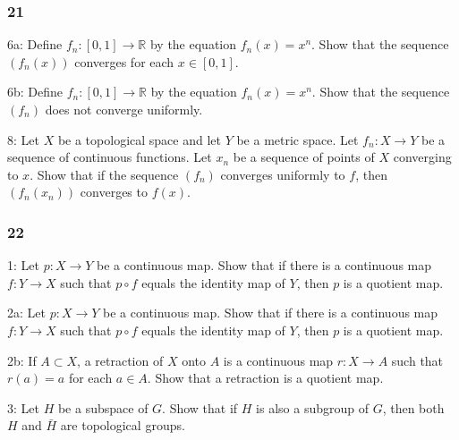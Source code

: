 \documentclass{article}
\begin{document}
\subsubsection*{21}

6a: Define $f_{n}:[0,1] \rightarrow \mathbb{R}$ by the equation $f_{n}(x)=x^{n}$. Show that the sequence $\left(f_{n}(x)\right)$ converges for each $x \in[0,1]$. 

6b: Define $f_{n}:[0,1] \rightarrow \mathbb{R}$ by the equation $f_{n}(x)=x^{n}$. Show that the sequence $\left(f_{n}\right)$ does not converge uniformly.

8: Let $X$ be a topological space and let $Y$ be a metric space. Let $f_{n}: X \rightarrow Y$ be a sequence of continuous functions. Let $x_{n}$ be a sequence of points of $X$ converging to $x$. Show that if the sequence $\left(f_{n}\right)$ converges uniformly to $f$, then $\left(f_{n}\left(x_{n}\right)\right)$ converges to $f(x)$.

\subsubsection*{22}
1: Let $p: X \rightarrow Y$ be a continuous map. Show that if there is a continuous map $f: Y \rightarrow X$ such that $p \circ f$ equals the identity map of $Y$, then $p$ is a quotient map.

2a: Let $p: X \rightarrow Y$ be a continuous map. Show that if there is a continuous map $f: Y \rightarrow X$ such that $p \circ f$ equals the identity map of $Y$, then $p$ is a quotient map.

2b: If $A \subset X$, a retraction of $X$ onto $A$ is a continuous map $r: X \rightarrow A$ such that $r(a)=a$ for each $a \in A$. Show that a retraction is a quotient map.

3: Let $H$ be a subspace of $G$. Show that if $H$ is also a subgroup of $G$, then both $H$ and $\bar{H}$ are topological groups.
\end{document}

